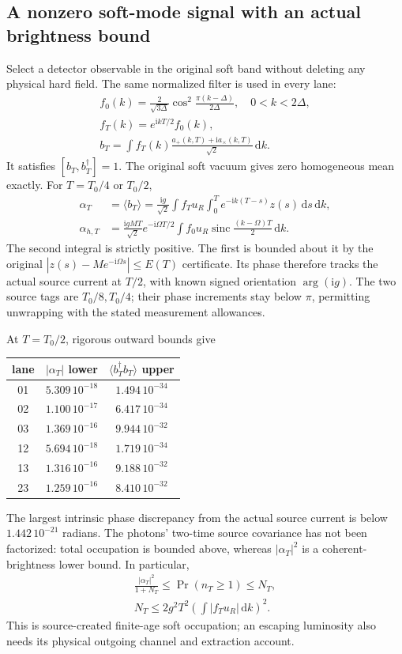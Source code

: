 \documentclass[10pt,twocolumn,letterpaper]{article}
\newcommand{\dd}{\mathrm{d}}
\begin{document}
\subsection{A nonzero soft-mode signal with an actual brightness bound}
Select a detector observable in the original soft band without deleting
any physical hard field. The same normalized filter is used in every lane:
\[
 \begin{gathered}
 f_0(k)=\frac{2}{\sqrt{3\Delta}}
       \cos^2\!\frac{\pi(k-\Delta)}{2\Delta},\quad0<k<2\Delta,\\
 f_T(k)=e^{\mathrm{i}kT/2}f_0(k),\\
 b_T=\int f_T(k)\frac{a_+(k,T)+\mathrm{i}a_\times(k,T)}{\sqrt2}\,\dd k.
 \end{gathered}
\]
It satisfies $[b_T,b_T^\dagger]=1$. The original soft vacuum gives zero
homogeneous mean exactly. For $T=T_0/4$ or $T_0/2$,
\[
 \begin{split}
 \alpha_T&=\langle b_T\rangle
   =\frac{\mathrm{i}g}{\sqrt2}\int f_Tu_R
         \int_0^T e^{-\mathrm{i}k(T-s)}z(s)\,\dd s\,\dd k,\\
 \alpha_{h,T}&=\frac{\mathrm{i}gMT}{\sqrt2}e^{-\mathrm{i}\Omega T/2}
       \int f_0u_R\operatorname{sinc}\!\frac{(k-\Omega)T}{2}\,\dd k.
 \end{split}
\]
The second integral is strictly positive. The first is bounded about it by
the original $|z(s)-Me^{-\mathrm{i}\Omega s}|\le E(T)$ certificate.
Its phase therefore tracks the actual source current at $T/2$, with
known signed orientation $\arg(\mathrm{i}g)$. The two source tags are
$T_0/8,T_0/4$; their phase increments stay below $\pi$, permitting
unwrapping with the stated measurement allowances.

At $T=T_0/2$, rigorous outward bounds give
\begin{center}
\begin{tabular}{c|cc}
lane&$|\alpha_T|$ lower&$\langle b_T^\dagger b_T\rangle$ upper\\\hline
01&$5.309\,10^{-18}$&$1.494\,10^{-34}$\\
02&$1.100\,10^{-17}$&$6.417\,10^{-34}$\\
03&$1.369\,10^{-16}$&$9.944\,10^{-32}$\\
12&$5.694\,10^{-18}$&$1.719\,10^{-34}$\\
13&$1.316\,10^{-16}$&$9.188\,10^{-32}$\\
23&$1.259\,10^{-16}$&$8.410\,10^{-32}$
\end{tabular}
\end{center}
The largest intrinsic phase discrepancy from the actual source current is
below $1.442\,10^{-21}$ radians. The photons' two-time source covariance
has not been factorized: total occupation is bounded above, whereas
$|\alpha_T|^2$ is a coherent-brightness lower bound. In particular,
\[
 \begin{gathered}
 \frac{|\alpha_T|^2}{1+N_T}\le\Pr(n_T\ge1)\le N_T,\\
 N_T\le2g^2T^2\left(\int|f_Tu_R|\,\dd k\right)^2.
 \end{gathered}
\]
This is source-created finite-age soft occupation; an escaping luminosity
also needs its physical outgoing channel and extraction account.
\end{document}
